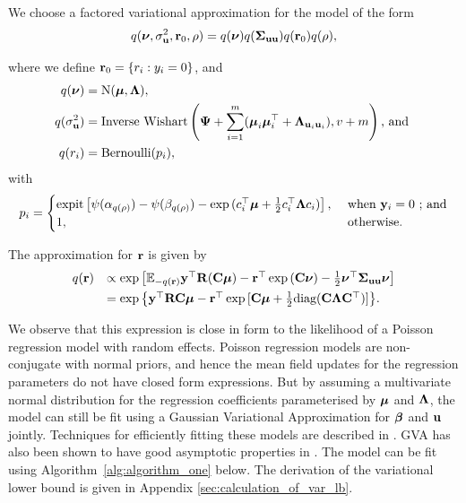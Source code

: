We choose a factored variational approximation for the model of the form 
\[
	q({\boldsymbol \nu}, \sigma_{{\bf u}}^2,{\bf r}_0, \rho) = q({\boldsymbol \nu}) q({\boldsymbol \Sigma}_{{\bf u} {\bf u}}) q({\bf r}_0) q(\rho),
\]

\noindent where we define ${\bf r}_0 = \{ r_i : y_i = 0 \}$, and
\begin{align*}
    q({\boldsymbol \nu}) &= \text{N}({\boldsymbol \mu}, {\boldsymbol \Lambda}), \\ 
    q(\sigma_{{\bf u}}^2) &= \text{Inverse Wishart}\left({\boldsymbol \Psi} + \sum_{i=1}^m ({\boldsymbol \mu}_i {\boldsymbol \mu}_i^\top + {\boldsymbol \Lambda}_{{\bf u}_i {\bf u}_i}), v + m \right) \mbox{, and } \\ 
    q(r_i) &= \text{Bernoulli}{(p_i)},
\end{align*}
with
$$p_i = 
\begin{cases}
    \text{expit}\left[ \psi{(\alpha_{q(\rho)})} - \psi{(\beta_{q(\rho)})} - \exp{(c_i^\top{\boldsymbol\mu}+ \frac{1}{2} c_i^\top {\boldsymbol\Lambda}c_i)} \right],& \text{ when } {\bf y}_i = 0\text{ ; and}\\
1,& \text{ otherwise.}
\end{cases}$$


The  approximation for ${\bf r}$ is given by %
\begin{equation}
\label{eq:optimal_approximation}
\begin{array}{rl}
    q({\bf r}) & \propto \exp \left[ {\mathbb E}_{-q({\bf r})}{\bf y}^\top{\bf R}({\bf C}{\boldsymbol \mu}) - {\bf r}^\top\exp{({\bf C}{\boldsymbol\nu})}-\frac{1}{2} {\boldsymbol \nu}^\top {\boldsymbol\Sigma}_{{\bf u} {\bf u}} {\boldsymbol \nu} \right] \\ [1ex]
           & = \exp{ \left\{ {\bf y}^\top{\bf R}{\bf C}{\boldsymbol\mu}- {\bf r}^\top \exp{[{\bf C}{\boldsymbol\mu}+ \frac{1}{2} \text{diag}({\bf C}{\boldsymbol\Lambda}{\bf C}^\top)]} \right\} }.
\end{array}
\end{equation}

We observe that this expression is close in form to the likelihood of a Poisson
regression model with random effects. Poisson regression models are
non-conjugate with normal priors, and hence the mean field updates for the
regression parameters do not have closed form expressions. But by assuming a
multivariate normal distribution for the regression coefficients parameterised
by ${\boldsymbol \mu}$ and ${\boldsymbol \Lambda}$, the model can still be fit using a Gaussian
Variational Approximation for ${\boldsymbol \beta}$ and ${\bf u}$ jointly. Techniques for
efficiently fitting these models are described in \cite{Ormerod2012,
Challis2013, Opper2009}. GVA has also been
shown to have good asymptotic properties in \cite{Sinica2017}. The model can be
fit using Algorithm~\ref{alg:algorithm_one} below. The derivation of the
variational lower bound is given in Appendix \ref{sec:calculation_of_var_lb}.

